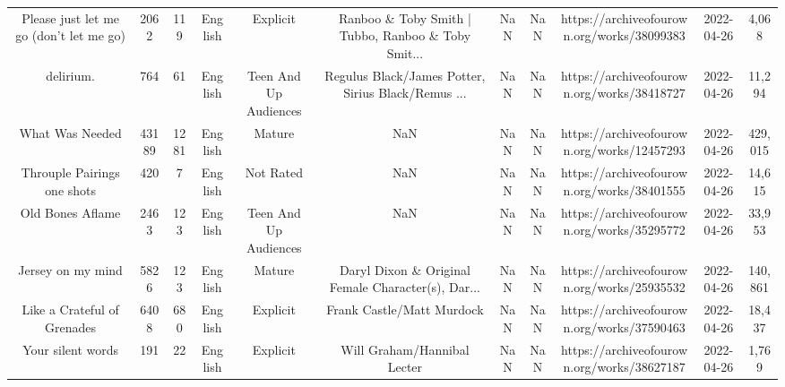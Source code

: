 \begin{table}[h!]
{\begin{tabular}{|c|c|c|c|c|c|c|c|c|c|c|}
           Please just let me go (don't let me go) &   2062 &   119 &  English &              Explicit & Ranboo \& Toby Smith | Tubbo, Ranboo \& Toby Smit... &                                                NaN &   NaN & https://archiveofourown.org/works/38099383 & 2022-04-26 &     4,068 \\
                                         delirium. &    764 &    61 &  English & Teen And Up Audiences & Regulus Black/James Potter, Sirius Black/Remus ... &                                                NaN &   NaN & https://archiveofourown.org/works/38418727 & 2022-04-26 &    11,294 \\
                                   What Was Needed &  43189 &  1281 &  English &                Mature &                                                NaN &                                                NaN &   NaN & https://archiveofourown.org/works/12457293 & 2022-04-26 &   429,015 \\
                       Throuple Pairings one shots &    420 &     7 &  English &             Not Rated &                                                NaN &                                                NaN &   NaN & https://archiveofourown.org/works/38401555 & 2022-04-26 &    14,615 \\
                                  Old Bones Aflame &   2463 &   123 &  English & Teen And Up Audiences &                                                NaN &                                                NaN &   NaN & https://archiveofourown.org/works/35295772 & 2022-04-26 &    33,953 \\
                                 Jersey on my mind &   5826 &   123 &  English &                Mature & Daryl Dixon \& Original Female Character(s), Dar... &                                                NaN &   NaN & https://archiveofourown.org/works/25935532 & 2022-04-26 &   140,861 \\
                       Like a Crateful of Grenades &   6408 &   680 &  English &              Explicit &                          Frank Castle/Matt Murdock &                                                NaN &   NaN & https://archiveofourown.org/works/37590463 & 2022-04-26 &    18,437 \\
                                 Your silent words &    191 &    22 &  English &              Explicit &                        Will Graham/Hannibal Lecter &                                                NaN &   NaN & https://archiveofourown.org/works/38627187 & 2022-04-26 &     1,769 \\

\end{tabular}}
\end{table}
